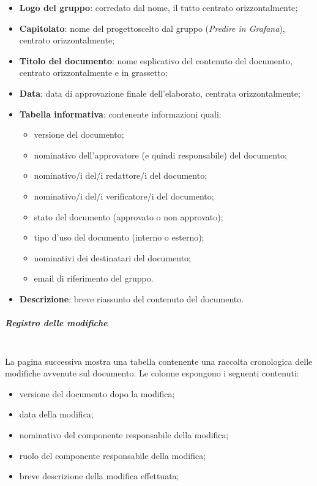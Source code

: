                 \begin{itemize}
                    \item \textbf{Logo del gruppo}: corredato dal nome, il tutto centrato orizzontalmente;
                    \item \textbf{Capitolato}\glo: nome del progetto\glosp scelto dal gruppo (\textit{Predire in Grafana}), centrato orizzontalmente;
                    \item \textbf{Titolo del documento}: nome esplicativo del contenuto del documento, centrato orizzontalmente e in grassetto;
                    \item \textbf{Data}: data di approvazione finale dell'elaborato, centrata orizzontalmente;
                    \item \textbf{Tabella informativa}: contenente informazioni quali:
                    \begin{itemize}
                        \item versione del documento;
                        \item nominativo dell'approvatore (e quindi responsabile) del documento;
                        \item nominativo/i del/i redattore/i del documento;
                        \item nominativo/i del/i verificatore/i del documento;
                        \item stato del documento (approvato o non approvato);
                        \item tipo d'uso del documento (interno o esterno);
                        \item nominativi dei destinatari del documento;
                        \item email di riferimento del gruppo.
                    \end{itemize} 
                    \item \textbf{Descrizione}: breve riassunto del contenuto del documento.
                \end{itemize}
            \subparagraph{Registro delle modifiche}\mbox{}\\ [1mm]
                La pagina successiva mostra una tabella contenente una raccolta cronologica delle modifiche avvenute sul documento.
                Le colonne espongono i seguenti contenuti:
                \begin{itemize}
                    \item versione del documento dopo la modifica;
                    \item data della modifica;
                    \item nominativo del componente responsabile della modifica;
                    \item ruolo del componente responsabile della modifica;
                    \item breve descrizione della modifica effettuata;
                \end{itemize}

